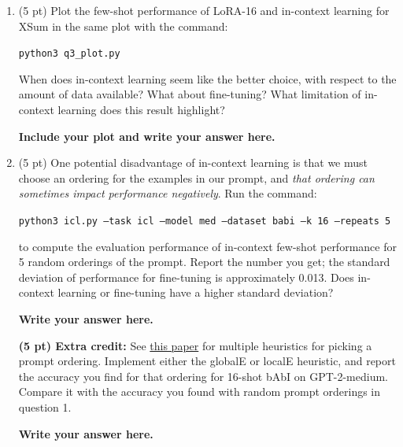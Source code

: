 \documentclass[12pt]{article}
\begin{document}
\begin{enumerate}
    \item (5 pt) Plot the few-shot performance of LoRA-16 and in-context learning for XSum in the same plot with the command:

    {\small\texttt{python3 q3\_plot.py}}

    When does in-context learning seem like the better choice, with respect to the amount of data available? What about fine-tuning? What limitation of in-context learning does this result highlight?
    
    \textbf{\color{red}Include your plot and write your answer here.}

    \item (5 pt) One potential disadvantage of in-context learning is that we must choose an ordering for the examples in our prompt, and \textit{that ordering can sometimes impact performance negatively}. Run the command:

    {\small \texttt{python3 icl.py --task icl --model med --dataset babi --k 16 --repeats 5}}

    to compute the evaluation performance of in-context few-shot performance for 5 random orderings of the prompt. Report the number you get; the standard deviation of performance for fine-tuning is approximately 0.013. Does in-context learning or fine-tuning have a higher standard deviation?
    
    \textbf{\color{red}Write your answer here.}

    \textbf{(5 pt) Extra credit:} See \href{https://arxiv.org/pdf/2104.08786.pdf}{this paper} for multiple heuristics for picking a prompt ordering. Implement either the globalE or localE heuristic, and report the accuracy you find for that ordering for 16-shot bAbI on GPT-2-medium. Compare it with the accuracy you found with random prompt orderings in question 1.
    
    \textbf{\color{red}Write your answer here.}
\end{enumerate}
\end{document}
